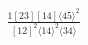 \documentclass[varwidth, border=5pt]{standalone}
\begin{document}
\begin{my}
$\begin{gathered}
\scriptscriptstyle\frac{1[23][14]⟨45⟩^2}{[12]^2⟨14⟩^2⟨34⟩}
\end{gathered}$
\end{my}
\end{document}
